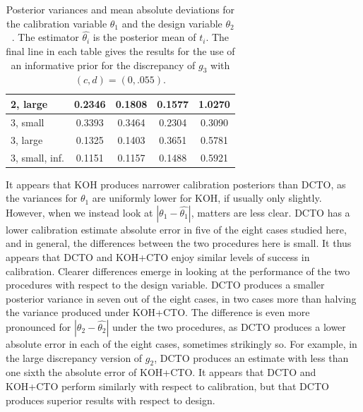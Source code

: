 \documentclass[12pt]{article}
\begin{document}
\begin{table}[]
\begin{tabular}{l|cc|cc}
2, large       & 0.2346 & 0.1808 & 0.1577 & 1.0270\\ \hline
3, small       & 0.3393 & 0.3464 & 0.2304 & 0.3090\\ \hline
3, large       & 0.1325 & 0.1403 & 0.3651 & 0.5781\\ \hline
3, small, inf. & 0.1151 & 0.1157 & 0.1488 & 0.5921\\ \hline
\end{tabular}
\caption{Posterior variances and mean absolute deviations for the calibration variable $\theta_1$ and the design variable $\theta_2$. The estimator $\widehat{\theta_i}$ is the posterior mean of $t_i$. The final line in each table gives the results for the use of an informative prior for the discrepancy of $g_3$ with $(c,d)=(0,.055)$.} 
\label{table:vars_and_ads}
\end{table}
%
It appears that KOH produces narrower calibration posteriors than DCTO, as the variances for $\theta_1$ are uniformly lower for KOH, if usually only slightly.
%
However, when we instead look at $|\theta_1-\widehat{\theta_1}|$, matters are less clear.
%
DCTO has a lower calibration estimate absolute error in five of the eight cases studied here, and in general, the differences between the two procedures here is small.
%
It thus appears that DCTO and KOH+CTO enjoy similar levels of success in calibration.
%
Clearer differences emerge in looking at the performance of the two procedures with respect to the design variable.
%
DCTO produces a smaller posterior variance in seven out of the eight cases, in two cases more than halving the variance produced under KOH+CTO.
%
The difference is even more pronounced for $|\theta_2-\widehat{\theta_2}|$ under the two procedures, as DCTO produces a lower absolute error in each of the eight cases, sometimes strikingly so.
%
For example, in the large discrepancy version of $g_2$, DCTO produces an estimate with less than one sixth the absolute error of KOH+CTO.
%
It appears that DCTO and KOH+CTO perform similarly with respect to calibration, but that DCTO produces superior results with respect to design.
%


\bigskip

%
%
%
%




\end{document}
